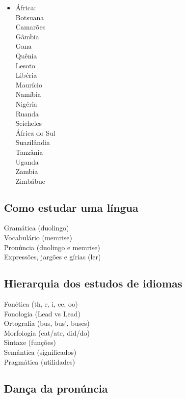 \documentclass[12pt,a4paper]{article} %
\begin{document}
\begin{itemize}
		\item África:\\
			Botsuana\\
			Camarões\\
			Gâmbia\\
			Gana\\
			Quênia\\
			Lesoto\\
			Libéria\\
			Maurício\\
			Namíbia\\
			Nigéria\\
			Ruanda\\
			Seicheles\\
			África do Sul\\
			Suazilândia\\
			Tanzânia\\
			Uganda\\
			Zambia\\
			Zimbábue
	\end{itemize}
\subsection{Como estudar uma língua}

	Gramática (duolingo)\\
	Vocabulário (memrise)\\
	Pronúncia (duolingo e memrise)\\
	Expressões, jargões e gírias (ler)\\

\subsection{Hierarquia dos estudos de idiomas}

	Fonética (th, r, i, ee, oo)\\
	Fonologia (Lead vs Lead)\\
	Ortografia (bus, bus', buses)\\
	Morfologia (eat/ate, did/do)\\
	Sintaxe (funções)\\
	Semântica (significados)\\
	Pragmática (utilidades)\\

\subsection{Dança da pronúncia}
\end{document}
